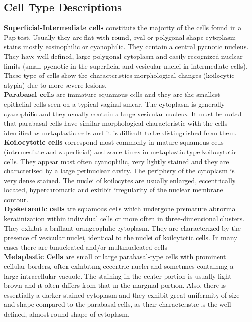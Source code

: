 \documentclass[ms,electronic,oneside,twosidetoc,letterpaper,chaptercenter,parttop]{byumsphd}
\begin{document}
\begin{appendices}
  \chapter{Cell Type Descriptions}

  \noindent \textbf{Superficial-Intermediate cells} constitute the majority of the cells found in a Pap test. Usually they are flat with round, oval or polygonal shape cytoplasm stains mostly eosinophilic or cyanophilic. They contain a central pycnotic nucleus. They have well defined, large polygonal cytoplasm and easily recognized nuclear limits (small pycnotic in the superficial and vesicular nuclei in intermediate cells). These type of cells show the characteristics morphological changes (koilocytic atypia) due to more severe lesions.
  \\ \textbf{Parabasal cells} are immature squamous cells and they are the smallest epithelial cells seen on a typical vaginal smear. The cytoplasm is generally cyanophilic and they usually contain a large vesicular nucleus. It must be noted that parabasal cells have similar morphological characteristic with the cells identified as metaplastic cells and it is difficult to be distinguished from them.    
  \\ \textbf{Koilocytotic cells} correspond most commonly in mature squamous cells (intermediate and superficial) and some times in metaplastic type koilocytotic cells. They appear most often cyanophilic, very lightly stained and they are characterized by a large perinuclear cavity. The periphery of the cytoplasm is very dense stained. The nuclei of koilocytes are usually enlarged, eccentrically located, hyperchromatic and exhibit irregularity of the nuclear membrane contour. 
  \\ \textbf{Dysketarotic cells} are squamous cells which undergone premature abnormal keratinization within individual cells or more often in three-dimensional clusters. They exhibit a brilliant orangeophilic cytoplasm. They are characterized by the presence of vesicular nuclei, identical to the nuclei of koilcytotic cells. In many cases there are binucleated and/or multinucleated cells.
  \\ \textbf{Metaplastic Cells} are small or large parabasal-type cells with prominent cellular borders, often exhibiting eccentric nuclei and sometimes containing a large intracellular vacuole. The staining in the center portion is usually light brown and it often differs from that in the marginal portion. Also, there is essentially a darker-stained cytoplasm and they exhibit great uniformity of size and shape compared to the parabasal cells, as their characteristic is the well defined, almost round shape of cytoplasm.\cite{sipakmed}

\end{appendices}



\end{document}
